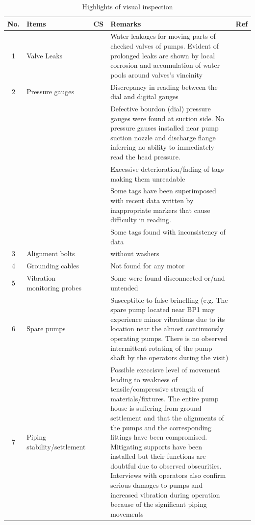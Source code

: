 \begin{table}[!htb]
	\caption{Highlights of visual inspection}
	\label{ch04_visualinspection01}
	{\scriptsize
\begin{tabular}{c|p{2cm}|c|p{9.5cm}|l}
	\hline
	No. & Items & CS & Remarks & Ref \\ 
	\hline
	1 & Valve Leaks &  & Water leakages for moving parts of checked valves of pumps. Evident of prolonged leaks are shown by local corrosion and accumulation of water pools around valves's vincinity &  \\ 
	2 & Pressure gauges &  & Discrepancy in reading between the dial and digital gauges &  \\ 
	&  &  & Defective bourdon (dial) pressure gauges were found at suction side. No pressure gauses installed near pump suction nozzle and discharge flange inferring no ability to immediately read the head pressure. &  \\ 
	&  &  & Excessive deterioration/fading of tags making them unreadable &  \\ 
	&  &  & Some tags have been superimposed with recent data written by inappropriate markers that cause difficulty in reading. &  \\ 
	&  &  & Some tags found with inconsistency of data &  \\ 
	3 & Alignment bolts &  & without washers &  \\ 
	4 & Grounding cables &  & Not found for any motor &  \\ 
	5 & Vibration monitoring probes &  & Some were found disconnected or/and untended &  \\ 
	6 & Spare pumps &  & Susceptible to false brinelling (e.g. The spare pump located near BP1 may experience minor vibrations due to its location near the almost continuously operating pumps. There is no observed intermittent rotating of the pump shaft by the operators during the visit) &  \\ 
	7 & Piping stability/settlement &  & Possible execcisve level of movement leading to weakness of tensile/compressive strength of materials/fixtures. The entire pump house is suffering from ground settlement and that the alignments of the pumps and the corresponding fittings have been compromised. Mitigating supports have been installed but their functions are doubtful due to observed obscurities. Interviews with operators also confirm serious damages to pumps and increased vibration during operation because of the significant piping movements &  \\ 

\end{tabular}}
\end{table}
